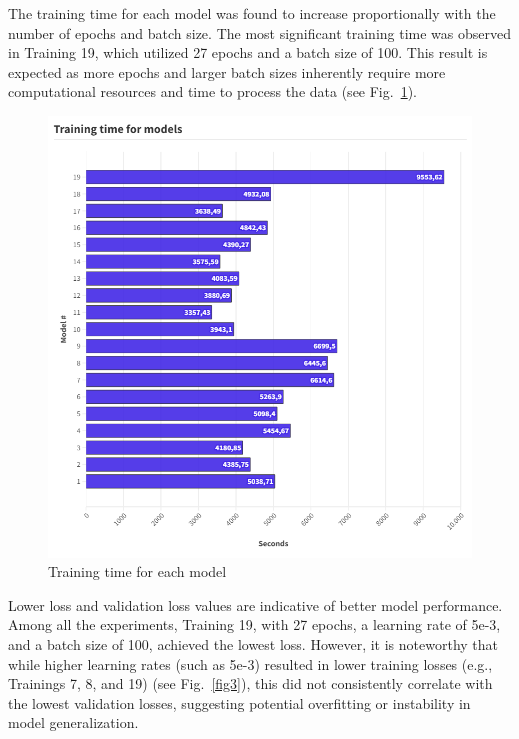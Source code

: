 \documentclass[runningheads]{llncs}
\begin{document}
The training time for each model was found to increase proportionally with the number of epochs and batch size. The most significant training time was observed in Training 19, which utilized 27 epochs and a batch size of 100. This result is expected as more epochs and larger batch sizes inherently require more computational resources and time to process the data (see Fig.~\ref{fig2}).

\begin{figure}
\includegraphics[width=\textwidth]{Training time for models (1).png}
\caption{Training time for each model} \label{fig2}
\end{figure}

Lower loss and validation loss values are indicative of better model performance. Among all the experiments, Training 19, with 27 epochs, a learning rate of 5e-3, and a batch size of 100, achieved the lowest loss. However, it is noteworthy that while higher learning rates (such as 5e-3) resulted in lower training losses (e.g., Trainings 7, 8, and 19) (see Fig.~\ref{fig3}), this did not consistently correlate with the lowest validation losses, suggesting potential overfitting or instability in model generalization.
\end{document}
